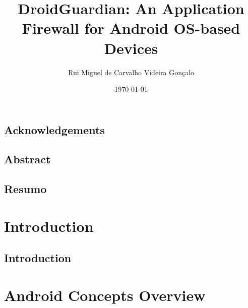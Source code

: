 \documentclass[
  oneside,
  11pt, a4paper,
  footinclude=true,
  headinclude=true,
  cleardoublepage=empty
]{scrbook}
\title{DroidGuardian: An Application Firewall for Android OS-based Devices}
\author{Rui Miguel de Carvalho Videira Gonçalo}
\date{\today}
\begin{document}
\sloppy



\sf
	\pagestyle{empty}
	
\rm
	\cleardoublepage

\chapter*{Acknowledgements}

	\cleardoublepage
	
\chapter*{Abstract}

	\cleardoublepage

\chapter*{Resumo}

	\cleardoublepage
	
	\setcounter{page}{3}
	\rm
	
	\cleardoublepage
	\tableofcontents
	
	\cleardoublepage
	\listoffigures
	
	\cleardoublepage
	\listoftables
	
	\cleardoublepage
	\lstlistoflistings

	\cleardoublepage
	\setcounter{page}{3}

\part{Introduction}

\chapter{Introduction}
\label{chap:introduction}


\part{Android Concepts Overview}
\end{document}
